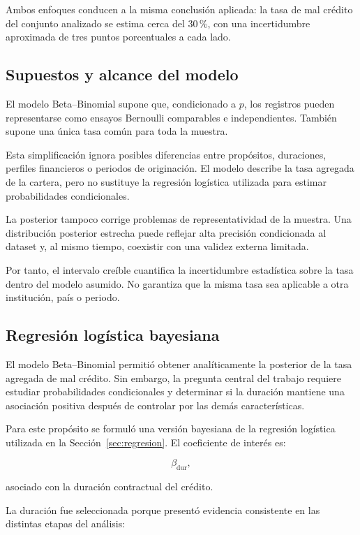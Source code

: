 Ambos enfoques conducen a la misma conclusión aplicada: la tasa de mal
crédito del conjunto analizado se estima cerca del \(30\,\%\), con una
incertidumbre aproximada de tres puntos porcentuales a cada lado.

\subsection{Supuestos y alcance del modelo}

El modelo Beta--Binomial supone que, condicionado a \(p\), los registros
pueden representarse como ensayos Bernoulli comparables e independientes.
También supone una única tasa común para toda la muestra.

Esta simplificación ignora posibles diferencias entre propósitos,
duraciones, perfiles financieros o periodos de originación. El modelo
describe la tasa agregada de la cartera, pero no sustituye la regresión
logística utilizada para estimar probabilidades condicionales.

La posterior tampoco corrige problemas de representatividad de la
muestra. Una distribución posterior estrecha puede reflejar alta precisión
condicionada al dataset y, al mismo tiempo, coexistir con una validez
externa limitada.

Por tanto, el intervalo creíble cuantifica la incertidumbre estadística
sobre la tasa dentro del modelo asumido. No garantiza que la misma tasa
sea aplicable a otra institución, país o periodo.

\subsection{Regresión logística bayesiana}
\label{subsec:logit-bayes}

El modelo Beta--Binomial permitió obtener analíticamente la posterior de
la tasa agregada de mal crédito. Sin embargo, la pregunta central del
trabajo requiere estudiar probabilidades condicionales y determinar si
la duración mantiene una asociación positiva después de controlar por
las demás características.

Para este propósito se formuló una versión bayesiana de la regresión
logística utilizada en la Sección~\ref{sec:regresion}. El coeficiente de
interés es:

\[
\beta_{\mathrm{dur}},
\]

asociado con la duración contractual del crédito.

La duración fue seleccionada porque presentó evidencia consistente en
las distintas etapas del análisis:

